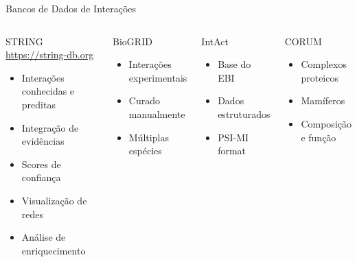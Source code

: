 \begin{frame}[shrink=10]{Bancos de Dados de Interações}
\begin{columns}
\begin{block}{STRING}
\url{https://string-db.org}
\begin{itemize}
    \item Interações conhecidas e preditas
    \item Integração de evidências
    \item Scores de confiança
    \item Visualização de redes
    \item Análise de enriquecimento
\end{itemize}
\end{block}

\begin{block}{BioGRID}
\begin{itemize}
    \item Interações experimentais
    \item Curado manualmente
    \item Múltiplas espécies
\end{itemize}
\end{block}

\begin{block}{IntAct}
\begin{itemize}
    \item Base do EBI
    \item Dados estruturados
    \item PSI-MI format
\end{itemize}
\end{block}

\begin{block}{CORUM}
\begin{itemize}
    \item Complexos proteicos
    \item Mamíferos
    \item Composição e função
\end{itemize}
\end{block}

\vspace{0.3cm}

\end{columns}
\end{frame}

